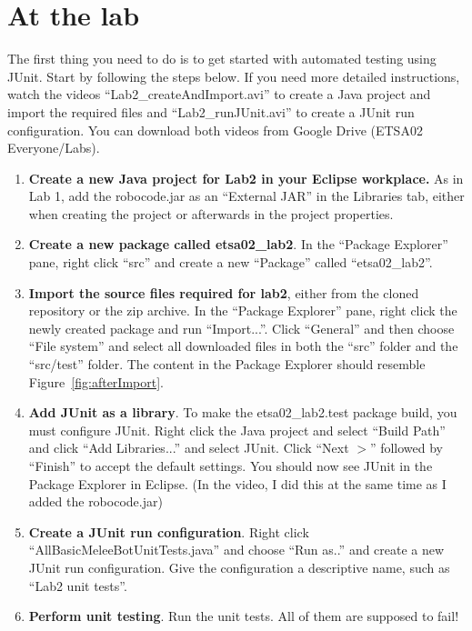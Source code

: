 \documentclass{scrreprt}
\begin{document}
\chapter{At the lab}
The first thing you need to do is to get started with automated testing using JUnit. Start by following the steps below. If you need more detailed instructions, watch the videos ``Lab2_createAndImport.avi'' to create a Java project and import the required files and ``Lab2_runJUnit.avi'' to create a JUnit run configuration. You can download both videos from Google Drive (ETSA02 Everyone/Labs).
\begin{enumerate}
\item \textbf{Create a new Java project for Lab2 in your Eclipse workplace.} As in Lab 1, add the robocode.jar as an ``External JAR'' in the Libraries tab, either when creating the project or afterwards in the project properties.
\item \textbf{Create a new package called etsa02_lab2}. In the ``Package Explorer'' pane, right click ``src'' and create a new ``Package'' called ``etsa02_lab2''.
\item \textbf{Import the source files required for lab2}, either from the cloned repository or the zip archive. In the ``Package Explorer'' pane, right click the newly created package and run ``Import...''. Click ``General'' and then choose ``File system'' and select all downloaded files in both the ``src'' folder and the ``src/test'' folder. The content in the Package Explorer should resemble Figure~\ref{fig:afterImport}.
\item \textbf{Add JUnit as a library}. To make the etsa02_lab2.test package build, you must configure JUnit. Right click the Java project and select ``Build Path'' and click ``Add Libraries...'' and select JUnit. Click ``Next $>$'' followed by ``Finish'' to accept the default settings. You should now see JUnit in the Package Explorer in Eclipse. (In the video, I did this at the same time as I added the robocode.jar)
\item \textbf{Create a JUnit run configuration}. Right click ``AllBasicMeleeBotUnitTests.java'' and choose ``Run as..'' and create a new JUnit run configuration. Give the configuration a descriptive name, such as ``Lab2 unit tests''.
\item \textbf{Perform unit testing}. Run the unit tests. All of them are supposed to fail!
\end{enumerate}
\end{document}
